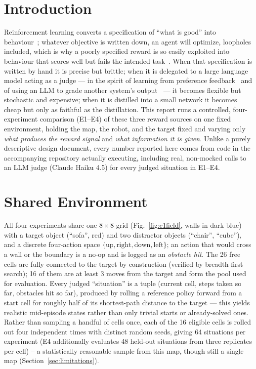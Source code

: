 \documentclass[10pt,conference]{IEEEtran}
\begin{document}
\section{Introduction}
Reinforcement learning converts a specification of ``what is good'' into
behaviour~\citep{sutton2018rl}; whatever objective is written down, an
agent will optimize, loopholes included, which is why a poorly specified
reward is so easily exploited into behaviour that scores well but fails
the intended task~\citep{amodei2016concrete}. When that specification is
written by hand it is precise but brittle; when it is delegated to a
large language model acting as a judge --- in the spirit of learning from
preference feedback~\citep{christiano2017rlhf} and of using an LLM to
grade another system's output~\citep{zheng2023judging} --- it becomes
flexible but stochastic and expensive; when it is distilled into a small
network it becomes cheap but only as faithful as the distillation. This
report runs a controlled, four-experiment comparison (E1--E4) of these
three reward sources on one fixed environment, holding the map, the
robot, and the target fixed and varying only \emph{what produces the
reward signal} and \emph{what information it is given}. Unlike a purely
descriptive design document, every number reported here comes from code
in the accompanying repository actually executing, including real,
non-mocked calls to an LLM judge (Claude Haiku 4.5) for every judged
situation in E1--E4.

\section{Shared Environment}
\label{sec:env}
All four experiments share one $8\times8$ grid (Fig.~\ref{fig:e1field},
walls in dark blue) with a target object (``sofa'', red) and two
distractor objects (``chair'', ``cube''), and a discrete four-action
space $\{\text{up}, \text{right}, \text{down}, \text{left}\}$; an action
that would cross a wall or the boundary is a no-op and is logged as an
\emph{obstacle hit}. The 26 free cells are fully connected to the target
by construction (verified by breadth-first search); 16 of them are at
least 3 moves from the target and form the pool used for evaluation.
Every judged ``situation'' is a tuple (current cell, steps taken so far,
obstacles hit so far), produced by rolling a reference policy forward
from a start cell for roughly half of its shortest-path distance to the
target --- this yields realistic mid-episode states rather than only
trivial starts or already-solved ones. Rather than sampling a handful of
cells once, each of the 16 eligible cells is rolled out four independent
times with distinct random seeds, giving 64 situations per experiment
(E4 additionally evaluates 48 held-out situations from three replicates
per cell) -- a statistically reasonable sample from this map, though
still a single map (Section~\ref{sec:limitations}).
\end{document}
